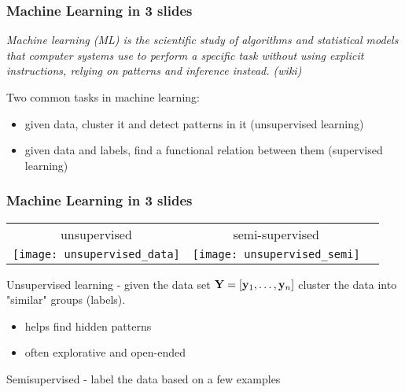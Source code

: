 \documentclass[12pt,fleqn]{beamer}
\begin{document}
\begin{frame}\frametitle{{Machine Learning in 3 slides}}

{\em Machine learning (ML) is the scientific study of algorithms and statistical models that computer systems use to perform a specific task without using explicit instructions, relying on patterns and inference instead. (wiki)}

\bigskip\pause

Two common tasks in machine learning:
\begin{itemize}
\item given data, cluster it and detect patterns in it (unsupervised learning)
\item given data and labels, find a functional relation between them (supervised learning)
\end{itemize}



\end{frame}

\begin{frame}\frametitle{{Machine Learning in 3 slides}}
	
\begin{center}
	\begin{tabular}{ccc}
		unsupervised & semi-supervised \\
		\texttt{[image: unsupervised\_data]}&
		\texttt{[image: unsupervised\_semi]}		
	\end{tabular}
\end{center}

Unsupervised learning - given the data set ${\bf Y} = [{\bf y}_1,\ldots,{\bf y}_n]$
cluster the data into "similar" groups (labels).
 
\bigskip

\begin{itemize}
\item helps find hidden patterns
\item often explorative and open-ended
\end{itemize}

\bigskip

Semisupervised - label the data based on a few examples


\end{frame}
\end{document}

